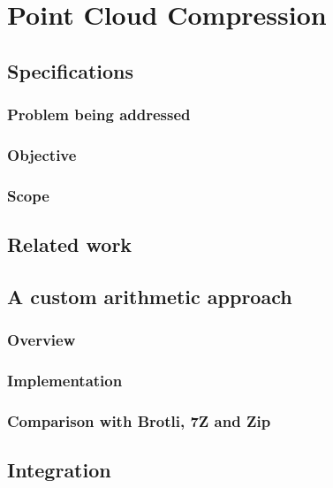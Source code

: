 \chapter{Point Cloud Compression}
\label{ch:compression}

\section{Specifications}

\subsection{Problem being addressed}


\subsection{Objective}


\subsection{Scope}



\section{Related work}



\section{A custom arithmetic approach}


\subsection{Overview}


\subsection{Implementation}


\subsection{Comparison with Brotli, 7Z and Zip}



\section{Integration}
